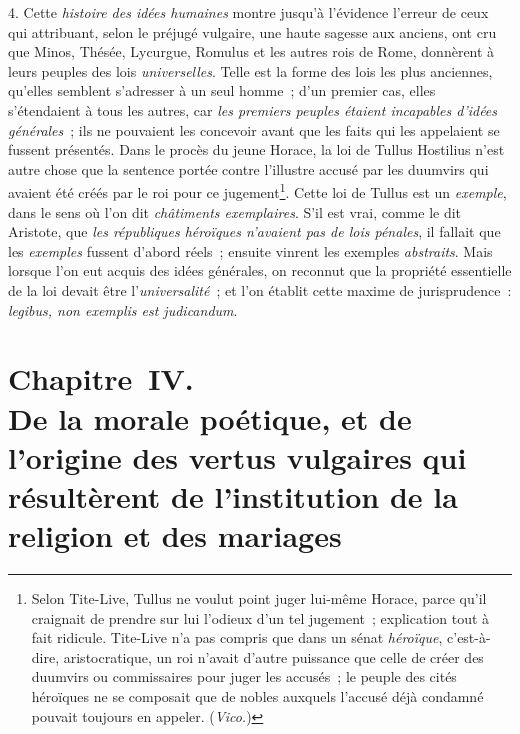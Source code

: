 \documentclass[french,twoside]{book} %
\newcommand\chapteropen{} %
\newcommand\chapterclose{} %
\begin{document}
4. Cette {\itshape histoire des idées humaines} montre jusqu’à l’évidence l’erreur de ceux qui attribuant, selon le préjugé vulgaire, une haute sagesse aux anciens, ont cru que Minos, Thésée, Lycurgue, Romulus et les autres rois de Rome, donnèrent à leurs peuples des lois {\itshape universelles}. Telle est la forme des lois les plus anciennes, qu’elles semblent s’adresser à un seul homme ; d’un premier cas, elles s’étendaient à tous les autres, car {\itshape les premiers peuples étaient incapables d’idées générales} ; ils ne pouvaient les concevoir avant que les faits qui les appelaient se fussent présentés. Dans le procès du jeune Horace, la loi de Tullus Hostilius n’est autre chose que la sentence portée contre l’illustre accusé par les duumvirs qui avaient été créés par le roi pour ce  jugement\footnote{Selon Tite-Live, Tullus ne voulut point juger lui-même Horace, parce qu’il craignait de prendre sur lui l’odieux d’un tel jugement ; explication tout à fait ridicule. Tite-Live n’a pas compris que dans un sénat {\itshape héroïque}, c’est-à-dire, aristocratique, un roi n’avait d’autre puissance que celle de créer des duumvirs ou commissaires pour juger les accusés ; le peuple des cités héroïques ne se composait que de nobles auxquels l’accusé déjà condamné pouvait toujours en appeler. ({\itshape Vico.})}. Cette loi de Tullus est un {\itshape exemple}, dans le sens où l’on dit {\itshape châtiments exemplaires}. S’il est vrai, comme le dit Aristote, que \emph{{\itshape les républiques héroïques n’avaient pas de lois pénales}}, il fallait que les {\itshape exemples} fussent d’abord réels ; ensuite vinrent les exemples {\itshape abstraits}. Mais lorsque l’on eut acquis des idées générales, on reconnut que la propriété essentielle de la loi devait être l’{\itshape universalité} ; et l’on établit cette maxime de jurisprudence : \emph{{\itshape legibus, non exemplis est judicandum}}.
\chapterclose


\chapteropen
\chapter[{Chapitre IV. De la morale poétique, et de l’origine des vertus vulgaires qui résultèrent de l’institution de la religion et des mariages}]{Chapitre IV. \\
De la morale poétique, et de l’origine des vertus vulgaires qui résultèrent de l’institution de la religion et des mariages}
\end{document}
